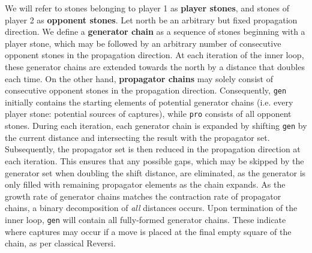 We will refer to stones belonging to player 1 as \textbf{player stones}, and stones of player 2 as \textbf{opponent stones}. Let north be an arbitrary but fixed propagation direction. We define a \textbf{generator chain} as a sequence of stones beginning with a player stone, which may be followed by an arbitrary number of consecutive opponent stones in the propagation direction. At each iteration of the inner loop, these generator chains are extended towards the north by a distance that doubles each time. On the other hand, \textbf{propagator chains} may solely consist of consecutive opponent stones in the propagation direction. Consequently, \texttt{gen} initially contains the starting elements of potential generator chains (i.e. every player stone: potential sources of captures), while \texttt{pro} consists of all opponent stones. During each iteration, each generator chain is expanded by shifting \texttt{gen} by the current distance and intersecting the result with the propagator set. Subsequently, the propagator set is then reduced in the propagation direction at each iteration. This ensures that any possible gaps, which may be skipped by the generator set when doubling the shift distance, are eliminated, as the generator is only filled with remaining propagator elements as the chain expands. As the growth rate of generator chains matches the contraction rate of propagator chains, a binary decomposition of \textit{all} distances occurs. Upon termination of the inner loop, \texttt{gen} will contain all fully-formed generator chains. These indicate where captures may occur if a move is placed at the final empty square of the chain, as per classical Reversi.
